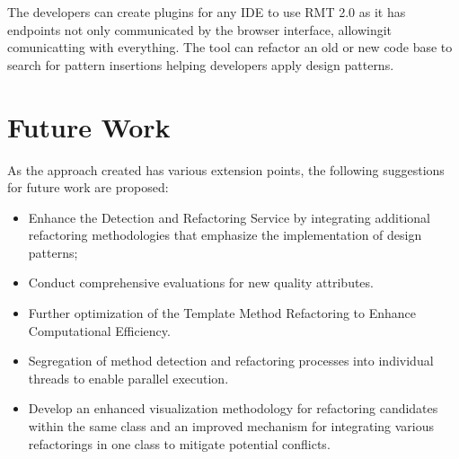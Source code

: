 The developers can create plugins for any IDE to use RMT 2.0 as it has endpoints not only communicated by the browser interface, allowingit comunicatting with everything. The tool can refactor an old or new code base to search for pattern insertions helping developers apply design patterns.

\section{Future Work}

As the approach created has various extension points, the following suggestions for future work are proposed:
\begin{itemize}
  \item Enhance the Detection and Refactoring Service by integrating additional refactoring methodologies that emphasize the implementation of design patterns; 
    \item Conduct comprehensive evaluations for new quality attributes.
  \item Further optimization of the Template Method Refactoring to Enhance Computational Efficiency. 
  \item Segregation of method detection and refactoring processes into individual threads to enable parallel execution.
  \item Develop an enhanced visualization methodology for refactoring candidates within the same class and an improved mechanism for integrating various refactorings in one class to mitigate potential conflicts.
\end{itemize}
